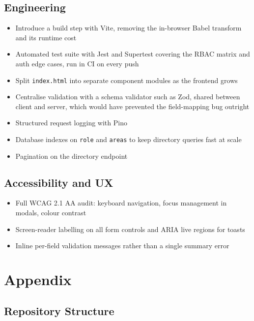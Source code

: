 \documentclass[11pt,letterpaper]{article}
\begin{document}
\subsection{Engineering}
\begin{itemize}
  \item Introduce a build step with Vite, removing the in-browser Babel
        transform and its runtime cost
  \item Automated test suite with Jest and Supertest covering the RBAC matrix
        and auth edge cases, run in CI on every push
  \item Split \texttt{index.html} into separate component modules as the
        frontend grows
  \item Centralise validation with a schema validator such as Zod, shared
        between client and server, which would have prevented the
        field-mapping bug outright
  \item Structured request logging with Pino
  \item Database indexes on \texttt{role} and \texttt{areas} to keep directory
        queries fast at scale
  \item Pagination on the directory endpoint
\end{itemize}

\subsection{Accessibility and UX}
\begin{itemize}
  \item Full WCAG 2.1 AA audit: keyboard navigation, focus management in
        modals, colour contrast
  \item Screen-reader labelling on all form controls and ARIA live regions
        for toasts
  \item Inline per-field validation messages rather than a single summary error
\end{itemize}

\section{Appendix}

\subsection{Repository Structure}
\end{document}
